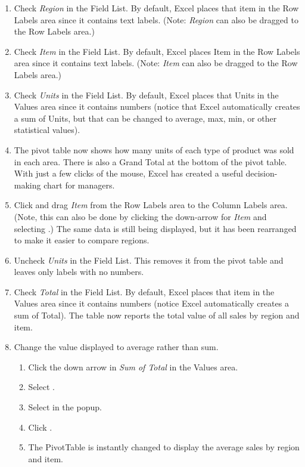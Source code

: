 \begin{enumerate}[resume]
	\item Check \textit{Region} in the Field List. By default, Excel places that item in the Row Labels area since it contains text labels. (Note: \textit{Region} can also be dragged to the Row Labels area.)
	\item Check \textit{Item} in the Field List. By default, Excel places Item in the Row Labels area since it contains text labels. (Note: \textit{Item} can also be dragged to the Row Labels area.)
	\item Check \textit{Units} in the Field List. By default, Excel places that Units in the Values area since it contains numbers (notice that Excel automatically creates a sum of Units, but that can be changed to average, max, min, or other statistical values). 
	\item The pivot table now shows how many units of each type of product was sold in each area. There is also a Grand Total at the bottom of the pivot table. With just a few clicks of the mouse, Excel has created a useful decision-making chart for managers.
	\item Click and drag \textit{Item} from the Row Labels area to the Column Labels area. (Note, this can also be done by clicking the down-arrow for \textit{Item} and selecting .) The same data is still being displayed, but it has been rearranged to make it easier to compare regions.
	\item Uncheck \textit{Units} in the Field List. This removes it from the pivot table and leaves only labels with no numbers.
	\item Check \textit{Total} in the Field List. By default, Excel places that item in the Values area since it contains numbers (notice Excel automatically creates a sum of Total). The table now reports the total value of all sales by region and item.
	\item Change the value displayed to average rather than sum.
	
	\begin{enumerate}
		\item Click the down arrow in \textit{Sum of Total} in the Values area. 
		\item Select .
		\item Select  in the popup.
		\item Click .
		\item The PivotTable is instantly changed to display the average sales by region and item.
	\end{enumerate}


\end{enumerate}
